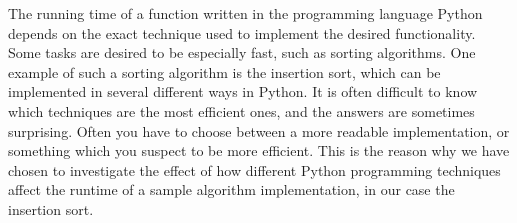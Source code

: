 The running time of a function written in the programming language Python depends on the exact technique used to implement the desired functionality. Some tasks are desired to be especially fast, such as sorting algorithms. One example of such a sorting algorithm is the insertion sort, which can be implemented in several different ways in Python. 
It is often difficult to know which techniques are the most efficient ones, and the answers are sometimes surprising. Often you have to choose between a more readable implementation, or something which you suspect to be more efficient. This is the reason why we have chosen to investigate the effect of how different Python programming techniques affect the runtime of a sample algorithm implementation, in our case the insertion sort.

